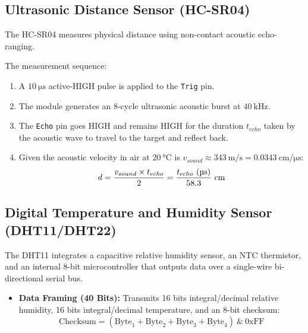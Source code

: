 \subsection{Ultrasonic Distance Sensor (HC-SR04)}
The HC-SR04 measures physical distance using non-contact acoustic echo-ranging.

\begin{derivationbox}
The measurement sequence:
\begin{enumerate}
    \item A $\SI{10}{\micro\second}$ active-HIGH pulse is applied to the \texttt{Trig} pin.
    \item The module generates an 8-cycle ultrasonic acoustic burst at $\SI{40}{\kilo\hertz}$.
    \item The \texttt{Echo} pin goes HIGH and remains HIGH for the duration $t_{echo}$ taken by the acoustic wave to travel to the target and reflect back.
    \item Given the acoustic velocity in air at $\SI{20}{\celsius}$ is $v_{sound} \approx \SI{343}{\meter\per\second} = \SI{0.0343}{\centi\meter\per\micro\second}$:
    \begin{equation}
    d = \frac{v_{sound} \times t_{echo}}{2} = \frac{t_{echo} \text{ (\SI{}{\micro\second})}}{58.3} \text{ \SI{}{\centi\meter}}
    \end{equation}
\end{enumerate}
\end{derivationbox}

\subsection{Digital Temperature and Humidity Sensor (DHT11/DHT22)}
The DHT11 integrates a capacitive relative humidity sensor, an NTC thermistor, and an internal 8-bit microcontroller that outputs data over a single-wire bi-directional serial bus.
\begin{itemize}
    \item \textbf{Data Framing (40 Bits):} Transmits 16 bits integral/decimal relative humidity, 16 bits integral/decimal temperature, and an 8-bit checksum:
    \begin{equation}
    \text{Checksum} = (\text{Byte}_1 + \text{Byte}_2 + \text{Byte}_3 + \text{Byte}_4) \ \& \ \text{0xFF}
    \end{equation}
\end{itemize}

